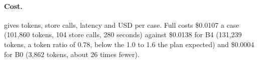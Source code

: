 \paragraph{Cost.}  gives tokens, store calls, latency and USD per case. Full costs \$0.0107 a case (101,860 tokens, 104 store calls, 280 seconds) against \$0.0138 for B4 (131,239 tokens, a token ratio of 0.78, below the 1.0 to 1.6 the plan expected) and \$0.0004 for B0 (3,862 tokens, about 26 times fewer).

